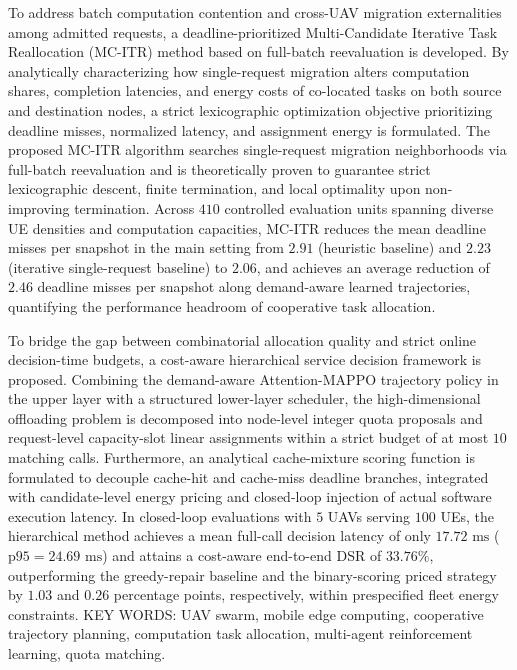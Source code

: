 \begin{abstract*}
To address batch computation contention and cross-UAV migration externalities among admitted requests, a deadline-prioritized Multi-Candidate Iterative Task Reallocation (MC-ITR) method based on full-batch reevaluation is developed. By analytically characterizing how single-request migration alters computation shares, completion latencies, and energy costs of co-located tasks on both source and destination nodes, a strict lexicographic optimization objective prioritizing deadline misses, normalized latency, and assignment energy is formulated. The proposed MC-ITR algorithm searches single-request migration neighborhoods via full-batch reevaluation and is theoretically proven to guarantee strict lexicographic descent, finite termination, and local optimality upon non-improving termination. Across $410$ controlled evaluation units spanning diverse UE densities and computation capacities, MC-ITR reduces the mean deadline misses per snapshot in the main setting from $2.91$ (heuristic baseline) and $2.23$ (iterative single-request baseline) to $2.06$, and achieves an average reduction of $2.46$ deadline misses per snapshot along demand-aware learned trajectories, quantifying the performance headroom of cooperative task allocation.  

To bridge the gap between combinatorial allocation quality and strict online decision-time budgets, a cost-aware hierarchical service decision framework is proposed. Combining the demand-aware Attention-MAPPO trajectory policy in the upper layer with a structured lower-layer scheduler, the high-dimensional offloading problem is decomposed into node-level integer quota proposals and request-level capacity-slot linear assignments within a strict budget of at most $10$ matching calls. Furthermore, an analytical cache-mixture scoring function is formulated to decouple cache-hit and cache-miss deadline branches, integrated with candidate-level energy pricing and closed-loop injection of actual software execution latency. In closed-loop evaluations with $5$ UAVs serving $100$ UEs, the hierarchical method achieves a mean full-call decision latency of only $17.72\text{ ms}$ ($\text{p95} = 24.69\text{ ms}$) and attains a cost-aware end-to-end DSR of $33.76\%$, outperforming the greedy-repair baseline and the binary-scoring priced strategy by $1.03$ and $0.26$ percentage points, respectively, within prespecified fleet energy constraints.   KEY WORDS: UAV swarm, mobile edge computing, cooperative trajectory planning, computation task allocation, multi-agent reinforcement learning, quota matching.
\end{abstract*}
